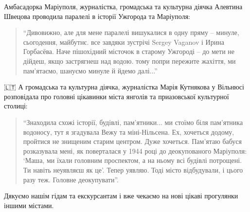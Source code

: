 Амбасадорка Маріуполя, журналістка, громадська та культурна діячка Алевтина
Швецова проводила паралелі в історії Ужгорода та Маріуполя: 

\begin{quote}
\enquote{Дивовижно, але для
мене паралелі вишукалися в одну пряму – минуле, сьогодення, майбутнє. все
завдяки зустрічі Sergey Vaganov і Ирина Горбасёва. Наче пішохідний місточок в
старому Ужгороді – до мети не дійдеш, якщо застрягнеш над водою. тому попри
пережите жахіття, ми пам'ятаємо, шануємо минуле й йдемо далі...}
\end{quote}

🇱🇹 А громадська та культурна діячка, журналістка Марія Кутнякова у Вільнюсі
розповідала про головні цікавинки міста янголів та приазовської культурної
столиці: 

\begin{quote}
\enquote{Знаходила схожі історії, будівлі, пам'ятники... ми стоїмо біля
пам'ятника водоносу, тут я згадувала Вежу та міні-Нільсена. Ех, хочеться
додому, пройтися не знищеним старим центром. Дуже хочеться. Пам'ятаю бабуся
розказувала мені, як поверталася у 1944 році до деокупованого Маріуполя: \enquote{Маша,
ми їхали головним проспектом, а на ньому всі будівлі потрощені. Ти навіть
неуявляєш як це}. Тепер уявляю. Тоді місто відбудували, і цього разу теж.
Головне деокупувати}.
\end{quote}

Дякуємо нашім гідам та екскурсантам і вже чекаємо на нові цікаві прогулянки
іншими містами.
